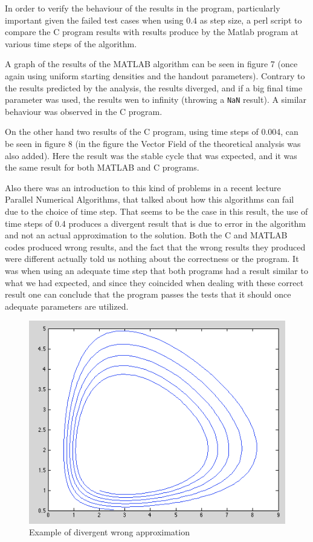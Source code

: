 \documentclass[12pt,a4paper]{article}
\begin{document}
In order to verify the behaviour of the results in the program, particularly important given the failed test cases when using 0.4 as step size, a perl script to compare the C program results with results produce by the Matlab program at various time steps of the algorithm. 

A graph of the results of the MATLAB algorithm can be seen in figure 7 (once again using uniform starting densities and the handout parameters). Contrary to the results predicted by the analysis, the results diverged, and if a big final time parameter was used, the results wen to infinity (throwing a \texttt{NaN} result). A similar behaviour was observed in the C program.

On the other hand two results of the C program, using time steps of 0.004, can be seen in figure 8 (in the figure the Vector Field of the theoretical analysis was also added). Here the result was the stable cycle that was expected, and it was the same result for both MATLAB and C programs.

Also there was an introduction to this kind of problems in a recent lecture Parallel Numerical Algorithms, that talked about how this algorithms can fail due to the choice of time step. That seems to be the case in this result, the use of time steps of 0.4 produces a divergent result that is due to error in the algorithm and not an actual approximation to the solution. Both the C and MATLAB codes produced wrong results, and the fact that the wrong results they produced were different actually told us nothing about the correctness or the program. It was when using an adequate time step that both programs had a result similar to what we had expected, and since they coincided when dealing with these correct result one can conclude that the program passes the tests that it should once adequate parameters are utilized.

\begin{figure}[hb]
    \centering
    \includegraphics[scale=0.5]{images/diverge.png}
    \caption{Example of divergent wrong approximation}
\end{figure}
\end{document}
